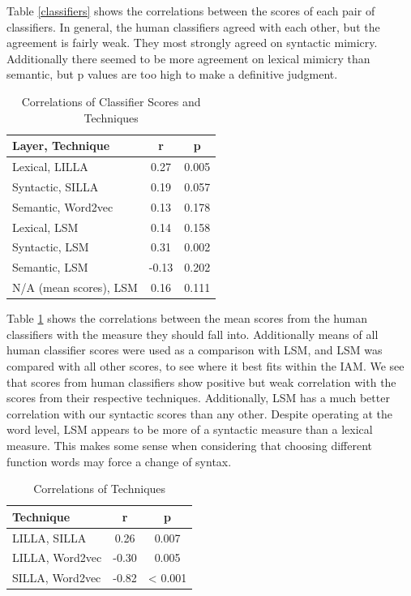 \documentclass[conference]{IEEEtran}
\begin{document}
Table \ref{classifiers} shows the correlations between the scores of each pair of classifiers. In general, the human classifiers agreed with each other, but the agreement is fairly weak. They most strongly agreed on syntactic mimicry. Additionally there seemed to be more agreement on lexical mimicry than semantic, but p values are too high to make a definitive judgment.

\begin{table}[!t]
\caption{Correlations of Classifier Scores and Techniques}
\label{scores_techniques}
\centering
\renewcommand{\arraystretch}{1.2}
\begin{tabular}{l c c}
Layer, Technique & r & p \\
\hline
Lexical, LILLA & 0.27 & 0.005 \\
Syntactic, SILLA & 0.19 & 0.057 \\
Semantic, Word2vec & 0.13 & 0.178 \\
Lexical, LSM & 0.14 & 0.158 \\
Syntactic, LSM & 0.31 & 0.002 \\
Semantic, LSM & -0.13 & 0.202 \\
N/A (mean scores), LSM & 0.16 & 0.111
\end{tabular}
\end{table}

Table \ref{scores_techniques} shows the correlations between the mean scores from the human classifiers with the measure they should fall into.  Additionally means of all human classifier scores were used as a comparison with LSM, and LSM was compared with all other scores, to see where it best fits within the IAM. We see that scores from human classifiers show positive but weak correlation with the scores from their respective techniques. Additionally, LSM has a much better correlation with our syntactic scores than any other. Despite operating at the word level, LSM appears to be more of a syntactic measure than a lexical measure. This makes some sense when considering that choosing different function words may force a change of syntax.

\begin{table}[!t]
\caption{Correlations of Techniques}
\label{techniques}
\centering
\renewcommand{\arraystretch}{1.2}
\begin{tabular}{l c c}
Technique & r & p \\
\hline
LILLA, SILLA & 0.26 & 0.007 \\
LILLA, Word2vec & -0.30 & 0.005 \\
SILLA, Word2vec & -0.82 & < 0.001
\end{tabular}
\end{table}
\end{document}
